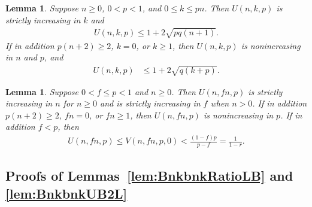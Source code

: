 \documentclass[aop]{imsart}
\theoremstyle{plain}
\newtheorem{lemma}[theorem]{Lemma}
\theoremstyle{remark}
\newcommand{\1}{\operatorname{\uppercase\expandafter{\romannumeral1}}}
\newcommand{\2}{\operatorname{\uppercase\expandafter{\romannumeral2}}}
\newcommand{\3}{\operatorname{\uppercase\expandafter{\romannumeral3}}}
\newcommand{\4}{\operatorname{\uppercase\expandafter{\romannumeral4}}}
\newcommand{\5}{\operatorname{\uppercase\expandafter{\romannumeral5}}}
\newcommand{\6}{\operatorname{\uppercase\expandafter{\romannumeral6}}}
\newcommand{\7}{\operatorname{\uppercase\expandafter{\romannumeral7}}}
\newcommand{\8}{\operatorname{\uppercase\expandafter{\romannumeral8}}}
\newcommand{\9}{\operatorname{\uppercase\expandafter{\romannumeral9}}}
\newcommand{\lsref}[1]{Lemmas~\ref{#1}}
\begin{document}
\begin{lemma}\label{lem:U1nkpMonoUB}
	Suppose $n\geq 0$, $0<p<1$, and $0\leq k\leq p n$. 
	Then $U(n,k,p)$ is strictly increasing in $k$ and
	\begin{align}\label{eq:U1nkpUB}
	U(n,k,p)\leq  1+2\sqrt{p q (n+1)}.
	\end{align}
	If in addition $p(n+2)\geq 2$,  $k=0$, or $k\geq 1$, then   $U(n,k,p)$ is  nonincreasing in $n$ and $p$, and  
	\begin{align}\label{eq:U1nkpUB2}
	U(n,k,p)&\leq 1+2\sqrt{q (k+p)}.
	\end{align}
\end{lemma}



\begin{lemma}\label{lem:U1nfpMono}
	Suppose $0<f\leq p<1$ and $n\geq 0$.  Then $U(n,f n,p)$ is strictly increasing in $n$ for $n\geq 0$ and is strictly increasing in  $f$ when $n>0$. If in addition $p(n+2)\geq 2$, $f n=0$, or $f n\geq 1$, then   $U(n,f n,p)$ is  nonincreasing in $p$. If in addition $f<p$, then 
	\begin{gather}
	U(n,f n,p)\leq V(n,f n,p,0)< \frac{(1-f)p}{p-f}=\frac{1}{1-r}. \label{eq:U12fUB}
	\end{gather}
\end{lemma}


\subsection{Proofs of \lsref{lem:BnkbnkRatioLB} and \ref{lem:BnkbnkUB2L}}\label{S4-3}
\end{document}
